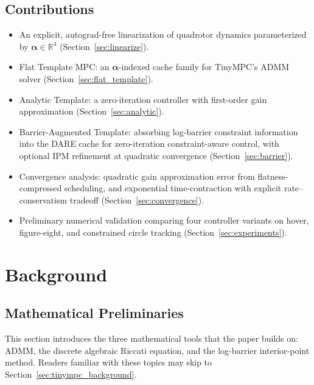 \documentclass[letterpaper, 10pt, conference]{IEEEtran}
\newcommand{\R}{\mathbb{R}}
\newcommand{\balpha}{\bm{\alpha}}
\begin{document}
\subsection*{Contributions}
\begin{itemize}
  \item An explicit, autograd-free linearization of quadrotor
    dynamics parameterized by $\balpha \in \R^4$
    (Section~\ref{sec:linearize}).
  \item Flat Template MPC: an $\balpha$-indexed cache family for
    TinyMPC's ADMM solver (Section~\ref{sec:flat_template}).
  \item Analytic Template: a zero-iteration controller with
    first-order gain approximation (Section~\ref{sec:analytic}).
  \item Barrier-Augmented Template: absorbing log-barrier constraint
    information into the DARE cache for zero-iteration
    constraint-aware control, with optional IPM refinement
    at quadratic convergence (Section~\ref{sec:barrier}).
  \item Convergence analysis: quadratic gain approximation error
    from flatness-compressed scheduling, and exponential
    time-contraction with explicit rate--conservatism tradeoff
    (Section~\ref{sec:convergence}).
  \item Preliminary numerical validation comparing four controller
    variants on hover, figure-eight, and constrained circle tracking
    (Section~\ref{sec:experiments}).
\end{itemize}

\section{Background}\label{sec:background}

\subsection{Mathematical Preliminaries}\label{sec:prelim}

This section introduces the three mathematical tools that
the paper builds on: ADMM, the discrete algebraic Riccati
equation, and the log-barrier interior-point method.
Readers familiar with these topics may skip to
Section~\ref{sec:tinympc_background}.
\end{document}
